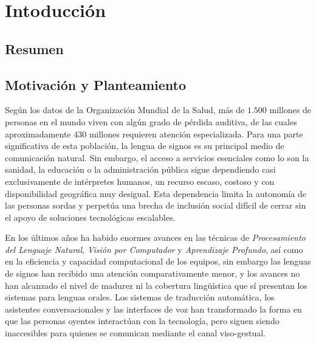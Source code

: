 \chapter{Intoducción}
\section{Resumen}

\section{Motivación y Planteamiento}
Según los datos de la Organización Mundial de la Salud, más de $1.500$ millones de personas en el mundo viven con algún grado de pérdida auditiva, de las cuales aproximadamente $430$ millones requieren atención especializada. Para una parte significativa de esta población, la lengua de signos es su principal medio de comunicación natural. Sin embargo, el acceso a servicios esenciales como lo son la sanidad, la educación o la administración pública sigue dependiendo casi exclusivamente de intérpretes humanos, un recurso escaso, costoso y con disponibilidad geográfica muy desigual. Esta dependencia limita la autonomía de las personas sordas y perpetúa una brecha de inclusión social difícil de cerrar sin el apoyo de soluciones tecnológicas escalables.

En los últimos años ha habido enormes avances en las técnicas de \textit{Procesamiento del Lenguaje Natural}, \textit{Visión por Computador} y \textit{Aprendizaje Profundo}, así como en la eficiencia y capacidad computacional de los equipos, sin embargo las lenguas de signos han recibido una atención comparativamente menor, y los avances no han alcanzado el nivel de madurez ni la cobertura lingüística que sí presentan los sistemas para lenguas orales. Los sistemas de traducción automática, los asistentes conversacionales y las interfaces de voz han transformado la forma en que las personas oyentes interactúan con la tecnología, pero siguen siendo inaccesibles para quienes se comunican mediante el canal viso-gestual.


